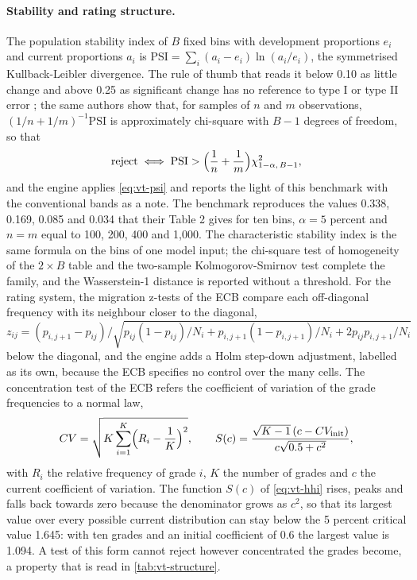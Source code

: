 \paragraph{Stability and rating structure.} The population stability index of $B$ fixed bins with development proportions $e_i$ and current proportions $a_i$ is
$\mathrm{PSI}=\sum_i(a_i-e_i)\ln(a_i/e_i)$, the symmetrised Kullback-Leibler divergence. The rule of thumb that reads it below 0.10 as little change and above 0.25 as significant change has no
reference to type I or type II error \citep{credit-scoring:yurdakul2020}; the same authors show that, for samples of $n$ and $m$ observations, $(1/n+1/m)^{-1}\mathrm{PSI}$ is approximately chi-square with
$B-1$ degrees of freedom, so that
\begin{equation}
  \text{reject}\iff \mathrm{PSI}>\Bigl(\frac1n+\frac1m\Bigr)\chi^2_{1-\alpha,\,B-1},
  \label{eq:vt-psi}
\end{equation}
and the engine applies \cref{eq:vt-psi} and reports the light of this benchmark with the conventional bands as a note. The benchmark reproduces the values 0.338, 0.169, 0.085 and 0.034 that their Table 2 gives for ten bins, $\alpha=5$ percent and $n=m$ equal to 100, 200, 400 and
1,000. The characteristic stability index is the same formula on the bins of one model input; the chi-square test of homogeneity of the $2\times B$ table and the two-sample Kolmogorov-Smirnov test complete the family, and the
Wasserstein-1 distance is reported without a threshold. For the rating system, the migration z-tests of the ECB compare each off-diagonal frequency with its neighbour closer to the diagonal,
$z_{ij}=(p_{i,j+1}-p_{ij})/\sqrt{p_{ij}(1-p_{ij})/N_i+p_{i,j+1}(1-p_{i,j+1})/N_i+2p_{ij}p_{i,j+1}/N_i}$ below the diagonal, and the engine adds a Holm step-down adjustment, labelled as its own, because the ECB specifies no
control over the many cells. The concentration test of the ECB refers the coefficient of variation of the grade frequencies to a normal law,
\begin{equation}
  CV=\sqrt{K\sum_{i=1}^{K}\Bigl(R_i-\frac1K\Bigr)^2},\qquad S(c)=\frac{\sqrt{K-1}\,(c-CV_{\mathrm{init}})}{c\sqrt{0.5+c^2}},
  \label{eq:vt-hhi}
\end{equation}
with $R_i$ the relative frequency of grade $i$, $K$ the number of grades and $c$ the current coefficient of variation. The function $S(c)$ of \cref{eq:vt-hhi} rises, peaks and falls back towards zero because the
denominator grows as $c^2$, so that its largest value over every possible current distribution can stay below the 5 percent critical value 1.645: with ten grades and an initial coefficient of
0.6 the largest value is 1.094. A test of this form cannot reject however concentrated the grades become, a property that is read in \cref{tab:vt-structure}.


